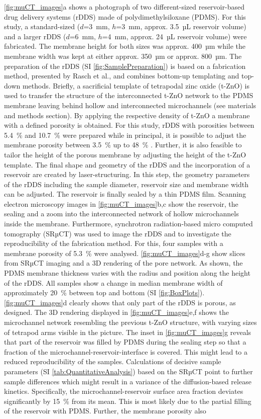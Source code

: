 \cref{fig:muCT_images}a shows a photograph of two different-sized reservoir-based drug delivery systems (rDDS) made of polydimethylsiloxane (PDMS). For this study, a standard-sized ($d$=3~mm, $h$=3~mm, approx. 3.5~µL reservoir volume) and a larger rDDS ($d$=6~mm, $h$=4~mm, approx. 24~µL reservoir volume) were fabricated. The membrane height for both sizes was approx. 400~µm while the membrane width was kept at either approx. 350~µm or approx. 800~µm. The preparation of the rDDS (SI \cref{fig:SamplePreparation}) is based on a fabrication method, presented by Rasch et al.\supercite{rasch2020macroscopic}, and combines bottom-up templating and top-down methods. Briefly, a sacrificial template of tetrapodal zinc oxide (t-ZnO) is used to transfer the structure of the interconnected t-ZnO network to the PDMS membrane leaving behind hollow and interconnected microchannels (see materials and methods section). By applying the respective density of t-ZnO a membrane with a defined porosity is obtained. For this study, rDDS with porosities between 5.4~\% and 10.7~\% were prepared while in principal, it is possible to adjust the membrane porosity between 3.5~\% up to 48~\% \supercite{rasch2020macroscopic}. Further, it is also feasible to tailor the height of the porous membrane by adjusting the height of the t-ZnO template. The final shape and geometry of the rDDS and the incorporation of a reservoir are created by laser-structuring. In this step, the geometry parameters of the rDDS including the sample diameter, reservoir size and membrane width can be adjusted. The reservoir is finally sealed by a thin PDMS film. Scanning electron microscopy images in \cref{fig:muCT_images}b,c show the reservoir, the sealing and a zoom into the interconnected network of hollow microchannels inside the membrane. Furthermore, synchrotron radiation-based micro computed tomography (SRµCT) was used to image the rDDS and to investigate the reproducibility of the fabrication method. For this, four samples with a membrane porosity of 5.3~\% were analysed. \cref{fig:muCT_images}d-g show slices from SRµCT imaging and a 3D rendering of the pore network. As shown, the PDMS membrane thickness varies with the radius and position along the height of the rDDS. All samples show a change in median membrane width of approximately 20~\% between top and bottom (SI \cref{fig:BoxPlots}). \cref{fig:muCT_images}d clearly shows that only part of the rDDS is porous, as designed. The 3D rendering displayed in \cref{fig:muCT_images}e,f shows the microchannel network resembling the previous t-ZnO structure, with varying sizes of tetrapod arms visible in the picture. The inset in \cref{fig:muCT_images}g reveals that part of the reservoir was filled by PDMS during the sealing step so that a fraction of the microchannel-reservoir-interface is covered. This might lead to a reduced reproducibility of the samples. Calculations of decisive sample parameters (SI \cref{tab:QuantitativeAnalysis}) based on the SRµCT point to further sample differences which might result in a variance of the diffusion-based release kinetics. Specifically, the microchannel-reservoir surface area fraction deviates significantly by 15~\% from its mean. This is most likely due to the partial filling of the reservoir with PDMS. Further, the membrane porosity also 